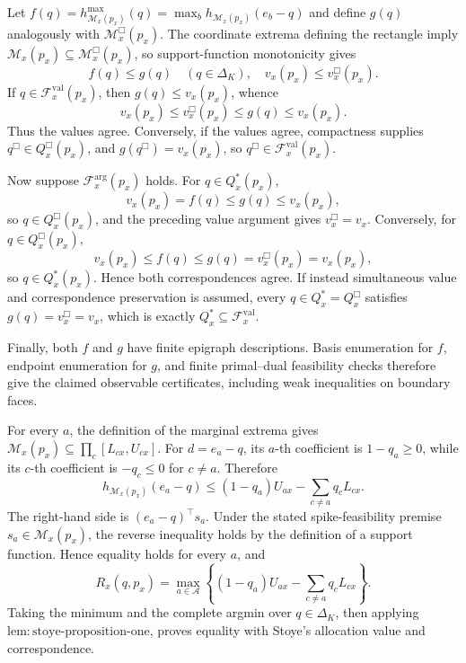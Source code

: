 Let \(f(q)=h_{\mathcal M_x(p_x)}^{\max}(q)=\max_bh_{\mathcal M_x(p_x)}(e_b-q)\) and define \(g(q)\) analogously with \(\mathcal M_x^{\Box}(p_x)\).  The coordinate extrema defining the rectangle imply \(\mathcal M_x(p_x)\subseteq\mathcal M_x^{\Box}(p_x)\), so support-function monotonicity gives
\[
 f(q)\leq g(q)\quad(q\in\Delta_K),\quad v_x(p_x)\leq v_x^{\Box}(p_x).
\]
If \(q\in\mathcal F_x^{\mathrm{val}}(p_x)\), then \(g(q)\leq v_x(p_x)\), whence
\[
 v_x(p_x)\leq v_x^{\Box}(p_x)\leq g(q)\leq v_x(p_x).
\]
Thus the values agree.  Conversely, if the values agree, compactness supplies \(q^{\Box}\in Q_x^{\Box}(p_x)\), and \(g(q^{\Box})=v_x(p_x)\), so \(q^{\Box}\in\mathcal F_x^{\mathrm{val}}(p_x)\).

Now suppose \(\mathcal F_x^{\mathrm{arg}}(p_x)\) holds.  For \(q\in Q_x^*(p_x)\),
\[
 v_x(p_x)=f(q)\leq g(q)\leq v_x(p_x),
\]
so \(q\in Q_x^{\Box}(p_x)\), and the preceding value argument gives \(v_x^{\Box}=v_x\).  Conversely, for \(q\in Q_x^{\Box}(p_x)\),
\[
 v_x(p_x)\leq f(q)\leq g(q)=v_x^{\Box}(p_x)=v_x(p_x),
\]
so \(q\in Q_x^*(p_x)\).  Hence both correspondences agree.  If instead simultaneous value and correspondence preservation is assumed, every \(q\in Q_x^*=Q_x^{\Box}\) satisfies \(g(q)=v_x^{\Box}=v_x\), which is exactly \(Q_x^*\subseteq\mathcal F_x^{\mathrm{val}}\).

Finally, both \(f\) and \(g\) have finite epigraph descriptions.  Basis enumeration for \(f\), endpoint enumeration for \(g\), and finite primal--dual feasibility checks therefore give the claimed observable certificates, including weak inequalities on boundary faces.

For every \(a\), the definition of the marginal extrema gives \(\mathcal M_x(p_x)\subseteq\prod_c[L_{cx},U_{cx}]\).  For \(d=e_a-q\), its \(a\)-th coefficient is \(1-q_a\geq0\), while its \(c\)-th coefficient is \(-q_c\leq0\) for \(c\neq a\).  Therefore
\[
 h_{\mathcal M_x(p_x)}(e_a-q)
 \leq (1-q_a)U_{ax}-\sum_{c\neq a}q_cL_{cx}.
\]
The right-hand side is \((e_a-q)^\top s_a\).  Under the stated spike-feasibility premise \(s_a\in\mathcal M_x(p_x)\), the reverse inequality holds by the definition of a support function.  Hence equality holds for every \(a\), and
\[
 R_x(q,p_x)=\max_{a\in\mathcal A}\left\{(1-q_a)U_{ax}-\sum_{c\neq a}q_cL_{cx}\right\}.
\]
Taking the minimum and the complete argmin over \(q\in\Delta_K\), then applying \(\mathrm{lem{:}stoye\text{-}proposition\text{-}one}\), proves equality with Stoye's allocation value and correspondence.

